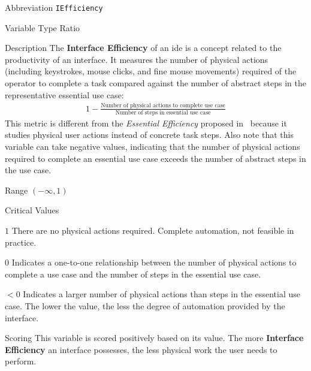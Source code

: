\begin{AlignedDesc}
  \item[Abbreviation] \texttt{IEfficiency}

  \item[Variable Type] Ratio

  \item[Description] The \textbf{Interface Efficiency} of an \ac{ide} is a
  concept related to the productivity of an interface. It measures the
  number of physical actions (including keystrokes, mouse clicks, and fine
  mouse movements) required of the operator to complete a task compared
  against the number of abstract steps in the representative essential use
  case:
%
  \begin{align*}
    1 - \frac{\text{Number of physical actions to complete use case}}
             {\text{Number of steps in essential use case}}
  \end{align*}
%
  This metric is different from the \textit{Essential Efficiency} proposed
  in~\cite{constantine1996} because it studies physical user actions
  instead of concrete task steps. Also note that this variable can take
  negative values, indicating that the number of physical actions required
  to complete an essential use case exceeds the number of abstract steps in
  the use case.

  \item[Range] $(-\infty, 1)$

  \item[Critical Values]
  \begin{AlignedDesc}
    \item[$1$] There are no physical actions required. Complete automation,
    not feasible in practice.
    \item[$0$] Indicates a one-to-one relationship between the number of
    physical actions to complete a use case and the number of steps in the
    essential use case.
    \item[$<0$] Indicates a larger number of physical actions than steps in
    the essential use case. The lower the value, the less the degree of
    automation provided by the interface.
  \end{AlignedDesc}

  \item[Scoring] This variable is scored positively based on its value. The
  more \textbf{Interface Efficiency} an interface possesses, the less
  physical work the user needs to perform.

\end{AlignedDesc}

